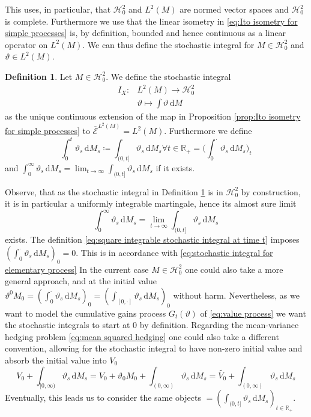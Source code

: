 \documentclass[11pt,a4paper,twoside,openany]{report}
\numberwithin{equation}{section}
\newcommand{\diff}{\mathrm{d}}
\theoremstyle{plain} %
\theoremstyle{definition} %
\newtheorem{definition}[theorem]{Definition}
\theoremstyle{remark} %
\begin{document}
This uses, in particular, that \(\mathcal{H}_0^2\) and \(L^2(M)\) are normed vector spaces and \(\mathcal{H}_0^2\) is complete. Furthermore we use that the linear isometry in \eqref{eq:Ito isometry for simple processes} is, by definition, bounded and hence continuous as a linear operator on \(L^2(M)\). We can thus define the stochastic integral for \(M\in\mathcal{H}^2_0\) and \(\vartheta\in L^2(M)\).
\begin{definition}\label{def:square-integrable stochastic integral}
    Let \(M\in\mathcal{H}^2_{0}\). We define the stochastic integral
    \begin{align*}
        I_X:&L^2(M)\to\mathcal{H}^2_{0}\\
        &\vartheta\mapsto\int \vartheta\,\diff M
    \end{align*}
    as the unique continuous extension of the map in Proposition \ref{prop:Ito isometry for simple processes} to \(\overline{\mathcal{E}}^{L^2(M)}=L^2(M)\).  Furthermore we define
    \begin{equation}\label{eq:square integrable stochastic integral at time t}
            \int_0^t\vartheta_s\,\diff M_s\coloneqq \int_{(0,t]}\vartheta_s\,\diff M_s\forall t\in\mathbb{R}_+=\bigg( \int_0^\cdot\vartheta_s\,\diff M_s\bigg)_{t}
    \end{equation}
    and \(\int_0^\infty\vartheta_s\,\diff M_s=\lim_{t\to\infty}\int_{(0,t]}\vartheta_s\,\diff M_s\) if it exists.
\end{definition}
Observe, that as the stochastic integral in Definition \ref{def:square-integrable stochastic integral} is in \(\mathcal{H}^2_0\) by construction, it is in particular a uniformly integrable martingale, hence its almost sure limit 
\begin{equation*}
    \int_0^\infty\vartheta_s\,\diff M_s=\lim_{t\to\infty}\int_{(0,t]}\vartheta_s\,\diff M_s
\end{equation*}
exists. The definition \eqref{eq:square integrable stochastic integral at time t} imposes \(( \int_0^\cdot\vartheta_s\,\diff M_s)_{0}=0\). This is in accordance with \eqref{eq:stochastic integral for elementary process} In the current case \(M\in\mathcal{H}^2_0\) one could also take a more general approach, and at the initial value \(\vartheta^0M_0=( \int_0^\cdot\vartheta_s\,\diff M_s)_{0}=(\int_{[0,\cdot]}\vartheta_s\,\diff M_s)_0\) without harm. Nevertheless, as we want to model the cumulative gains process \(G_{t}(\vartheta)\) of \eqref{eq:value process} we want the stochastic integrals to start at \(0\) by definition. Regarding the mean-variance hedging problem \eqref{eq:mean squared hedging} one could also take a different convention, allowing for the stochastic integral to have non-zero initial value and absorb the initial value into \(V_0\)
\begin{equation*}
 V_0+\int_{[0,\infty)}\vartheta_s\,\diff M_s=V_0+\vartheta_0M_0+\int_{(0,\infty)}\vartheta_s\,\diff M_s=\widetilde{V_0}+\int_{(0,\infty)}\vartheta_s\,\diff M_s   
\end{equation*}
Eventually, this leads us to consider the same objects \(=(\int_{(0,t]}\vartheta_s\,\diff M_s)_{t\in\mathbb{R}_+}\). 
\end{document}
